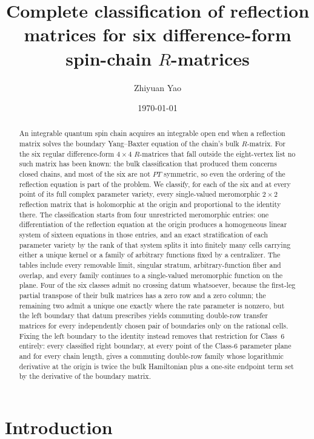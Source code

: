 \documentclass[11pt,reqno]{amsart}
\title[Reflection matrices for six difference-form $R$-matrices]
      {Complete classification of reflection matrices for six
       difference-form spin-chain $R$-matrices}
\author{Zhiyuan Yao}
\date{\today}
\theoremstyle{plain}
\theoremstyle{definition}
\theoremstyle{remark}
\numberwithin{equation}{section}
\begin{document}
\begin{abstract}
An integrable quantum spin chain acquires an integrable open end when a
reflection matrix solves the boundary Yang--Baxter equation of the chain's bulk
$R$-matrix. For the six regular difference-form $4\times4$ $R$-matrices that
fall outside the eight-vertex list no such matrix has been known: the bulk
classification that produced them concerns closed chains, and most of the six
are not $PT$ symmetric, so even the ordering of the reflection equation is part
of the problem. We classify, for each of the six and at every point of its full
complex parameter variety, every single-valued meromorphic $2\times2$ reflection
matrix that is holomorphic at the origin and proportional to the identity there.
The classification starts from four unrestricted meromorphic entries: one
differentiation of the reflection equation at the origin produces a homogeneous
linear system of sixteen equations in those entries, and an exact stratification
of each parameter variety by the rank of that system splits it into finitely
many cells carrying either a unique kernel or a family of arbitrary functions
fixed by a centralizer. The tables include every removable limit, singular
stratum, arbitrary-function fiber and overlap, and every family continues to a
single-valued meromorphic function on the plane. Four of the six classes admit
no crossing datum whatsoever, because the first-leg partial transpose of their
bulk matrices has a zero row and a zero column; the remaining two admit a unique
one exactly where the rate parameter is nonzero, but the left boundary that
datum prescribes yields commuting double-row transfer matrices for every
independently chosen pair of boundaries only on the rational cells. Fixing the
left boundary to the identity instead removes that restriction for Class~6
entirely: every classified right boundary, at every point of the Class-6
parameter plane and for every chain length, gives a commuting double-row family
whose logarithmic derivative at the origin is twice the bulk Hamiltonian plus a
one-site endpoint term set by the derivative of the boundary matrix.
\end{abstract}

\maketitle

\section{Introduction}
\label{sec:intro}
\end{document}
